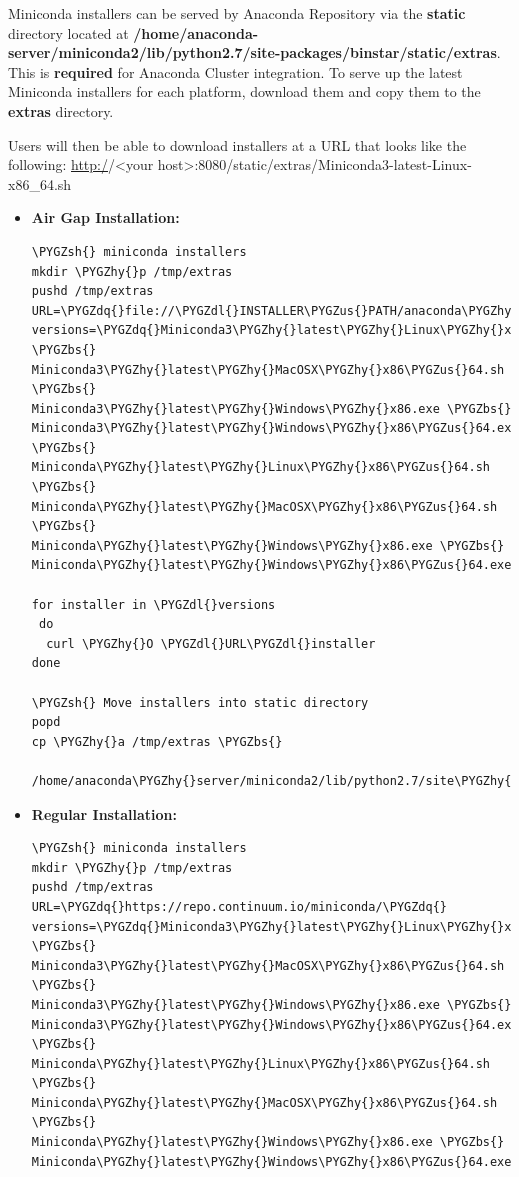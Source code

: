 \documentclass[letterpaper,10pt,openany,oneside]{sphinxmanual}
\def\PYGZbs{\char`\\}
\def\PYGZus{\char`\_}
\def\PYGZsh{\char`\#}
\def\PYGZdl{\char`\$}
\def\PYGZhy{\char`\-}
\def\PYGZdq{\char`\"}
\begin{document}
Miniconda installers can be served by Anaconda Repository via the \textbf{static}
directory located at
\textbf{/home/anaconda-server/miniconda2/lib/python2.7/site-packages/binstar/static/extras}.
This is \textbf{required} for Anaconda Cluster integration. To serve up the
latest Miniconda installers for each platform, download them and copy
them to the \textbf{extras} directory.

Users will then be able to download installers at a URL that looks like the
following: \url{http:/}/\textless{}your host\textgreater{}:8080/static/extras/Miniconda3-latest-Linux-x86\_64.sh
\begin{itemize}
\item {} 
\textbf{Air Gap Installation:}

\begin{Verbatim}[commandchars=\\\{\}]
\PYGZsh{} miniconda installers
mkdir \PYGZhy{}p /tmp/extras
pushd /tmp/extras
URL=\PYGZdq{}file://\PYGZdl{}INSTALLER\PYGZus{}PATH/anaconda\PYGZhy{}suite/miniconda/\PYGZdq{}
versions=\PYGZdq{}Miniconda3\PYGZhy{}latest\PYGZhy{}Linux\PYGZhy{}x86\PYGZus{}64.sh \PYGZbs{}
Miniconda3\PYGZhy{}latest\PYGZhy{}MacOSX\PYGZhy{}x86\PYGZus{}64.sh \PYGZbs{}
Miniconda3\PYGZhy{}latest\PYGZhy{}Windows\PYGZhy{}x86.exe \PYGZbs{}
Miniconda3\PYGZhy{}latest\PYGZhy{}Windows\PYGZhy{}x86\PYGZus{}64.exe \PYGZbs{}
Miniconda\PYGZhy{}latest\PYGZhy{}Linux\PYGZhy{}x86\PYGZus{}64.sh \PYGZbs{}
Miniconda\PYGZhy{}latest\PYGZhy{}MacOSX\PYGZhy{}x86\PYGZus{}64.sh \PYGZbs{}
Miniconda\PYGZhy{}latest\PYGZhy{}Windows\PYGZhy{}x86.exe \PYGZbs{}
Miniconda\PYGZhy{}latest\PYGZhy{}Windows\PYGZhy{}x86\PYGZus{}64.exe\PYGZdq{}

for installer in \PYGZdl{}versions
 do
  curl \PYGZhy{}O \PYGZdl{}URL\PYGZdl{}installer
done

\PYGZsh{} Move installers into static directory
popd
cp \PYGZhy{}a /tmp/extras \PYGZbs{}
  /home/anaconda\PYGZhy{}server/miniconda2/lib/python2.7/site\PYGZhy{}packages/binstar/static
\end{Verbatim}

\item {} 
\textbf{Regular Installation:}

\begin{Verbatim}[commandchars=\\\{\}]
\PYGZsh{} miniconda installers
mkdir \PYGZhy{}p /tmp/extras
pushd /tmp/extras
URL=\PYGZdq{}https://repo.continuum.io/miniconda/\PYGZdq{}
versions=\PYGZdq{}Miniconda3\PYGZhy{}latest\PYGZhy{}Linux\PYGZhy{}x86\PYGZus{}64.sh \PYGZbs{}
Miniconda3\PYGZhy{}latest\PYGZhy{}MacOSX\PYGZhy{}x86\PYGZus{}64.sh \PYGZbs{}
Miniconda3\PYGZhy{}latest\PYGZhy{}Windows\PYGZhy{}x86.exe \PYGZbs{}
Miniconda3\PYGZhy{}latest\PYGZhy{}Windows\PYGZhy{}x86\PYGZus{}64.exe \PYGZbs{}
Miniconda\PYGZhy{}latest\PYGZhy{}Linux\PYGZhy{}x86\PYGZus{}64.sh \PYGZbs{}
Miniconda\PYGZhy{}latest\PYGZhy{}MacOSX\PYGZhy{}x86\PYGZus{}64.sh \PYGZbs{}
Miniconda\PYGZhy{}latest\PYGZhy{}Windows\PYGZhy{}x86.exe \PYGZbs{}
Miniconda\PYGZhy{}latest\PYGZhy{}Windows\PYGZhy{}x86\PYGZus{}64.exe\PYGZdq{}


\end{Verbatim}
\end{itemize}
\end{document}
